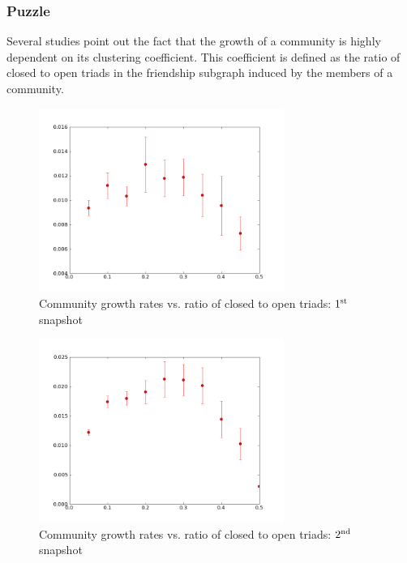 \subsubsection{Puzzle}

Several studies point out the fact that the growth of a community is highly dependent on its clustering coefficient.
This coefficient is defined as the ratio of closed to open triads in the friendship subgraph
induced by the members of a community.

\begin{figure}
  \begin{center}
    \includegraphics[width=8cm]{../figures/first.png}
    \caption{Community growth rates vs. ratio of closed to open triads: $1^{\rm st}$ snapshot}\label{fig:edge-a}
    \end{center}
\end{figure}

\begin{figure}
  \begin{center}
    \includegraphics[width=8cm]{../figures/second.png}
    \caption{Community growth rates vs. ratio of closed to open triads: $2^{\rm nd}$ snapshot}\label{fig:edge-b}
    \end{center}
\end{figure}


